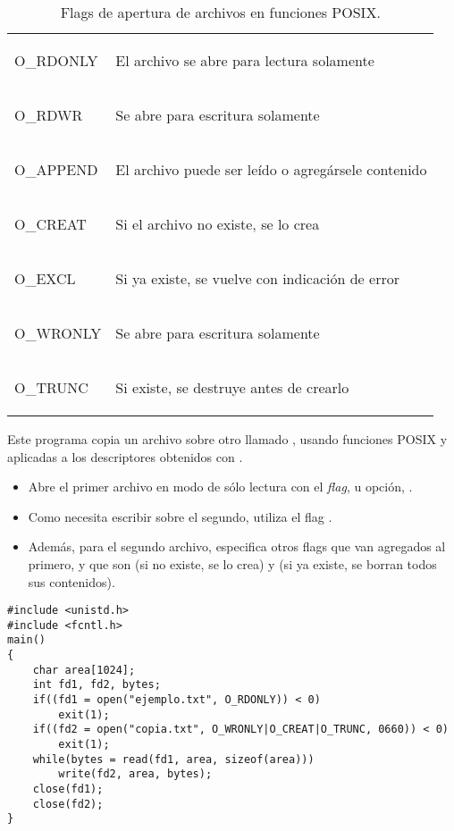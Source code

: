  \begin{table} 
 \centering 
 \small
 \begin{tabular}{l|l}
\begin{codecell}
O_RDONLY
\end{codecell} & El archivo se abre para lectura solamente\\
\begin{codecell}
O_RDWR
\end{codecell}   & Se abre para escritura solamente\\
\begin{codecell}
O_APPEND
\end{codecell} & El archivo puede ser leído o agregársele contenido\\
\begin{codecell}
O_CREAT
\end{codecell}  & Si el archivo no existe, se lo crea\\
\begin{codecell}
O_EXCL
\end{codecell}   & Si ya existe, se vuelve con indicación de error\\
\begin{codecell}
O_WRONLY
\end{codecell} & Se abre para escritura solamente\\
\begin{codecell}
O_TRUNC
\end{codecell}  & Si existe, se destruye antes de crearlo\\

 \end{tabular}
 \caption{Flags de apertura de archivos en funciones POSIX.}
 \label{tab:flags} 
 \end{table} 
 
\begin{ejemplo}
Este programa copia un archivo  sobre otro llamado , usando funciones POSIX  y  aplicadas a los descriptores obtenidos con .
\begin{itemize}
	\item Abre el primer archivo en modo de sólo lectura con el \textit{flag}, u opción, .
	\item Como necesita escribir sobre el segundo, utiliza el flag
. 
	\item Además, para el segundo archivo, especifica otros flags que van
agregados al primero, y que son  (si no existe, se lo crea) y  (si
ya existe, se borran todos sus contenidos).
\end{itemize}
\begin{lstlisting}
#include <unistd.h>
#include <fcntl.h>
main()
{
    char area[1024];
    int fd1, fd2, bytes;
    if((fd1 = open("ejemplo.txt", O_RDONLY)) < 0)
        exit(1);
    if((fd2 = open("copia.txt", O_WRONLY|O_CREAT|O_TRUNC, 0660)) < 0)
        exit(1);
    while(bytes = read(fd1, area, sizeof(area)))
        write(fd2, area, bytes);
    close(fd1);
    close(fd2);
}
\end{lstlisting}
\end{ejemplo}


